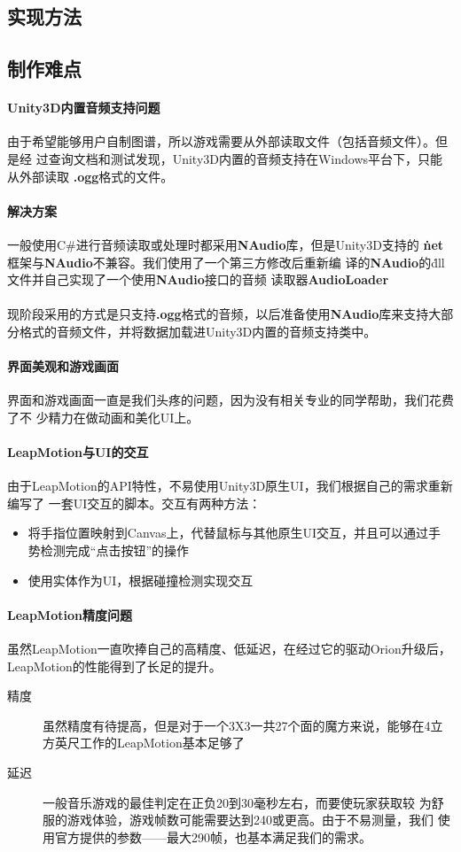 \documentclass{article}
\begin{document}
\subsection{实现方法}
\subsection{制作难点}
\paragraph{Unity3D内置音频支持问题}
由于希望能够用户自制图谱，所以游戏需要从外部读取文件（包括音频文件）。但是经
过查询文档和测试发现，Unity3D内置的音频支持在Windows平台下，只能从外部读取
\textbf{.ogg}格式的文件。
\paragraph{解决方案}
一般使用C\#进行音频读取或处理时都采用\textbf{NAudio}库，但是Unity3D支持的
\textbf{\.net}框架与\textbf{NAudio}不兼容。我们使用了一个第三方修改后重新编
译的\textbf{NAudio}的\.dll文件并自己实现了一个使用\textbf{NAudio}接口的音频
读取器\textbf{AudioLoader}
\paragraph{}
现阶段采用的方式是只支持\textbf{.ogg}格式的音频，以后准备使用\textbf{NAudio}库来支持大部分格式的音频文件，并将数据加载进Unity3D内置的音频支持类中。
\paragraph{界面美观和游戏画面}
界面和游戏画面一直是我们头疼的问题，因为没有相关专业的同学帮助，我们花费了不
少精力在做动画和美化UI上。
\paragraph{LeapMotion与UI的交互}
由于LeapMotion的API特性，不易使用Unity3D原生UI，我们根据自己的需求重新编写了
一套UI交互的脚本。交互有两种方法：
\begin{itemize}
  \item 将手指位置映射到Canvas上，代替鼠标与其他原生UI交互，并且可以通过手
      势检测完成“点击按钮”的操作
  \item 使用实体作为UI，根据碰撞检测实现交互
\end{itemize}
\paragraph{LeapMotion精度问题}
虽然LeapMotion一直吹捧自己的高精度、低延迟，在经过它的驱动Orion升级后，
LeapMotion的性能得到了长足的提升。
\begin{description}
  \item[精度] 虽然精度有待提高，但是对于一个3X3一共27个面的魔方来说，能够在4立方英尺工作的LeapMotion基本足够了
  \item[延迟] 一般音乐游戏的最佳判定在正负20到30毫秒左右，而要使玩家获取较
      为舒服的游戏体验，游戏帧数可能需要达到240或更高。由于不易测量，我们
      使用官方提供的参数——最大290帧，也基本满足我们的需求。
\end{description}
\end{document}
